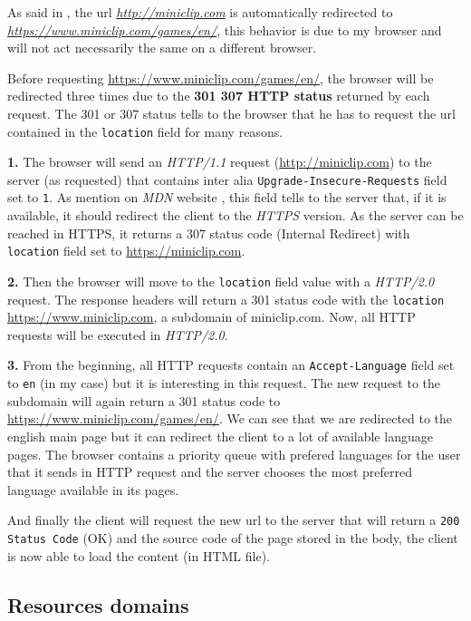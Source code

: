 \documentclass{article}
\newcommand{\link}[1]{\href{#1}{\textit{#1}}}
\begin{document}
As said in , the url \link{http://miniclip.com} is automatically redirected to \link{https://www.miniclip.com/games/en/}, this behavior is due to my browser and will not act necessarily the same on a different browser. 

Before requesting \url{https://www.miniclip.com/games/en/}, the browser will be redirected three times due to the \textbf{301  307 HTTP status} returned by each request. The 301 or 307 status tells to the browser that he has to request the url contained in the \texttt{location} field for many reasons.


\textbf{1.}
The browser will send an \textit{HTTP/1.1} request (\url{http://miniclip.com}) to the server (as requested) that contains inter alia \texttt{Upgrade-Insecure-Requests} field set to \texttt{1}. As mention on \textit{MDN} website \cite{upgrade-insecure-request}, this field tells to the server that, if it is available, it should redirect the client to the \textit{HTTPS} version. As the server can be reached in HTTPS, it returns a 307 status code (Internal Redirect) with \texttt{location} field set to \url{https://miniclip.com}.

\textbf{2.} 
Then the browser will move to the \texttt{location} field value with a \textit{HTTP/2.0} request. The response headers will return a 301 status code with the \texttt{location} \url{https://www.miniclip.com}, a subdomain of miniclip.com. Now, all HTTP requests will be executed in \textit{HTTP/2.0}.

\textbf{3.}
From the beginning, all HTTP requests contain an \texttt{Accept-Language} field set to \texttt{en} (in my case) but it is interesting in this request. The new request to the subdomain will again return a 301 status code to \url{https://www.miniclip.com/games/en/}. We can see that we are redirected to the english main page but it can redirect the client to a lot of available language pages. The browser contains a priority queue with prefered languages for the user that it sends in HTTP request and the server chooses the most preferred language available in its pages.

And finally the client will request the new url to the server that will return a \texttt{200 Status Code} (OK) and the
source code of the page stored in the body, the client is now able to load the content (in HTML file).

\subsection{Resources domains}
\label{sub:resdom}
\end{document}
